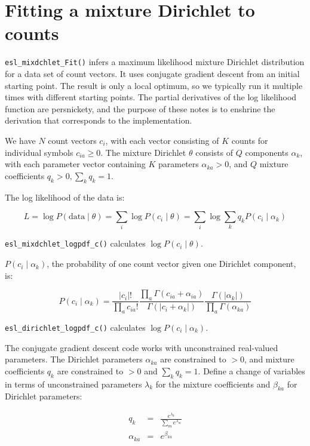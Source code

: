 \documentclass[11pt]{article}
\newcommand{\mono}[1]{{\smaller\texttt{#1}}}                    %
\begin{document}
\section{Fitting a mixture Dirichlet to counts}

\mono{esl\_mixdchlet\_Fit()} infers a maximum likelihood mixture
Dirichlet distribution for a data set of count vectors. It uses
conjugate gradient descent from an initial starting point. The result
is only a local optimum, so we typically run it multiple times with
different starting points. The partial derivatives of the log
likelihood function are persnickety, and the purpose of these notes is
to enshrine the derivation that corresponds to the implementation.

We have $N$ count vectors $c_i$, with each vector consisting of $K$
counts for individual symbols $c_{ia} \geq 0$. The mixture Dirichlet
$\theta$ consists of $Q$ components $\alpha_k$, with each parameter
vector containing $K$ parameters $\alpha_{ka} > 0$, and $Q$ mixture
coefficients $q_k > 0, \sum_k q_k = 1$.

The log likelihood of the data is:

\[
  L = \log P(\mbox{data} \mid \theta) = \sum_i \log P(c_i \mid \theta) = \sum_i \log \sum_k q_k P(c_i \mid \alpha_k)
\]

\mono{esl\_mixdchlet\_logpdf\_c()} calculates $\log P(c_i \mid
\theta)$.

$P(c_i \mid \alpha_k)$, the probability of one count vector given one
Dirichlet component, is:

\[
P(c_i \mid \alpha_k) = \frac{ |c_i|! }
                            { \prod_a c_{ia}! }
                       \frac{ \prod_a \Gamma \left( c_{ia} + \alpha_{ia} \right) }
                            { \Gamma ( |c_i + \alpha_k| ) }
                       \frac{ \Gamma ( |\alpha_k| ) }
                            { \prod_a \Gamma \left( \alpha_{ka} \right) }
\]

\mono{esl\_dirichlet\_logpdf\_c()} calculates $\log P(c_i \mid \alpha_k)$.

The conjugate gradient descent code works with unconstrained
real-valued parameters. The Dirichlet parameters $\alpha_{ka}$ are
constrained to $>0$, and mixture coefficients $q_k$ are constrained to
$>0$ and $\sum_k q_k = 1$. Define a change of variables in terms of
unconstrained parameters $\lambda_k$ for the mixture coefficients and
$\beta_{ka}$ for Dirichlet parameters:

\begin{eqnarray*}
  q_k          & = & \frac{ e^{\lambda_k} } { \sum_m e^{\lambda_m} } \\
  \alpha_{ka}  & = & e^{\beta_{ka}} 
\end{eqnarray*}
\end{document}
